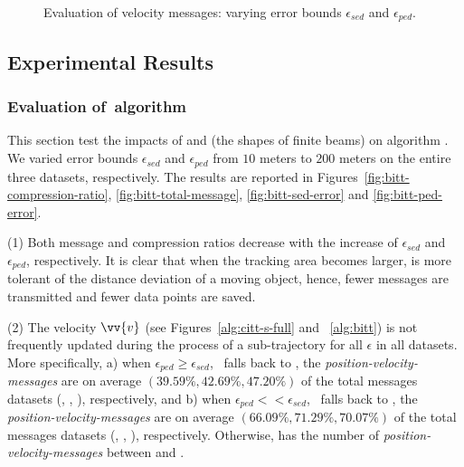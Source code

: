 {{\begin{figure}[tb!]
	\vspace{-1ex}
	\caption{\small Evaluation of velocity messages: varying error bounds $\epsilon_{sed}$ and $\epsilon_{ped}$.}
	\label{fig:speed-message}
	\vspace{-1ex}
\end{figure}
}%



\subsection{Experimental Results}

\subsubsection{Evaluation of~algorithm \bitt}
This section test the impacts of \ped and \sed (\ie the shapes of finite beams) on algorithm \bitt. We varied error bounds $\epsilon_{sed}$ and $\epsilon_{ped}$ from $10$ meters to $200$ meters on the entire three datasets, respectively. The results are reported in Figures~\ref{fig:bitt-compression-ratio}, \ref{fig:bitt-total-message}, \ref{fig:bitt-sed-error} and \ref{fig:bitt-ped-error}.


\ni (1) Both message and compression ratios decrease with the increase of $\epsilon_{sed}$ and $\epsilon_{ped}$, respectively. It is clear that when the tracking area becomes larger, \bitt is more tolerant of the distance deviation of a moving object, hence, fewer messages are transmitted and fewer data points are saved.

\ni (2) The velocity  $\vv{v}$ (see Figures~\ref{alg:citt-s-full} and ~\ref{alg:bitt}) is not frequently updated during the process of a sub-trajectory for all $\epsilon$ in all datasets. More specifically, a) when $\epsilon_{ped} \ge \epsilon_{sed}$, \ie~\bitt falls back to \citt, the \emph{position-velocity-messages} are on average $(39.59\%, 42.69\%, 47.20\%)$ of the total messages \wrt datasets (\mopsi, \sercar, \geolife), respectively, and b) when $\epsilon_{ped} << \epsilon_{sed}$, \ie~\bitt falls back to \sitt, the \emph{position-velocity-messages} are on average $(66.09\%, 71.29\%, 70.07\%)$ of the total messages \wrt datasets (\mopsi, \sercar, \geolife), respectively. Otherwise, \bitt has the number of \emph{position-velocity-messages} between \citt and \sitt.

}
